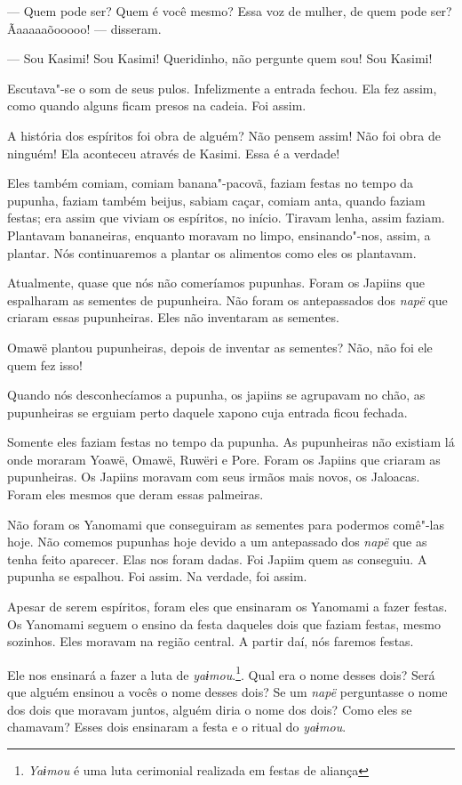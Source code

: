 --- Quem pode ser? Quem é você mesmo? Essa voz de mulher, de quem pode
ser? Ãaaaaaõooooo! --- disseram. 

--- Sou Kasimi! Sou Kasimi! Queridinho, não pergunte quem
sou! Sou Kasimi!

Escutava"-se o som de seus pulos. Infelizmente a entrada fechou. Ela fez
assim, como quando alguns ficam presos na
cadeia. Foi assim. 

A história dos espíritos foi obra de alguém? Não pensem assim! Não foi
obra de ninguém! Ela aconteceu através de Kasimi. Essa é a verdade! 

Eles também comiam, comiam banana"-pacovã, faziam festas no tempo da
pupunha, faziam também beijus, sabiam caçar, comiam anta, quando faziam
festas; era assim que viviam os espíritos, no início. Tiravam lenha,
assim faziam. Plantavam bananeiras, enquanto moravam no limpo,
ensinando"-nos, assim, a plantar. Nós continuaremos a plantar os
alimentos como eles os plantavam. 

Atualmente, quase que nós não comeríamos pupunhas. Foram os Japiins que
espalharam as sementes de pupunheira. Não foram os antepassados
dos \emph{napë} que criaram essas pupunheiras. Eles não inventaram as
sementes. 

Omawë plantou pupunheiras, depois de inventar as sementes? Não, não foi
ele quem fez isso!

Quando nós desconhecíamos a pupunha, os japiins se agrupavam no chão, as
pupunheiras se erguiam perto daquele xapono cuja entrada ficou fechada. 

Somente eles faziam festas no tempo da pupunha. As pupunheiras não
existiam lá onde moraram Yoawë, Omawë, Ruwëri e Pore. Foram os Japiins
que criaram as pupunheiras. Os Japiins moravam com seus irmãos mais
novos, os Jaloacas. Foram eles mesmos que deram essas palmeiras. 

Não foram os Yanomami que conseguiram as sementes para podermos comê"-las
hoje. Não comemos pupunhas hoje devido a um antepassado
dos \emph{napë} que as tenha feito aparecer. Elas nos foram
dadas. Foi Japiim quem as conseguiu. A pupunha se espalhou. Foi
assim. Na verdade, foi assim. 

Apesar de serem espíritos, foram eles que ensinaram os Yanomami a fazer
festas. Os Yanomami seguem o ensino da festa daqueles dois que faziam
festas, mesmo sozinhos. Eles moravam na região central. A partir daí,
nós faremos festas. 

Ele nos ensinará a fazer a luta de \emph{yaɨmou}.\footnote{  \emph{Yaɨmou} é uma luta cerimonial realizada em festas de aliança}. Qual era o nome
desses dois? Será que alguém ensinou a vocês o nome desses dois? Se
um \emph{napë} perguntasse o nome dos dois que moravam juntos, alguém
diria o nome dos dois? Como eles se chamavam? Esses dois
ensinaram a festa e o ritual do \emph{yaɨmou}. 